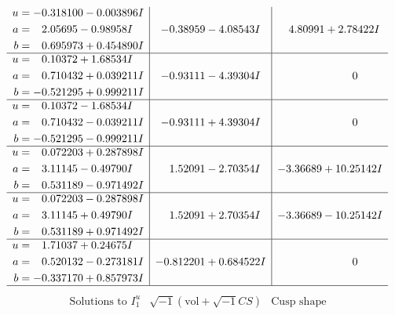 \documentclass[1p]{elsarticle_modified}
\theoremstyle{definition}
\newcommand{\I}{\sqrt{-1}}
\begin{document}
$$\begin{array}{c|c|c}
\begin{aligned}
u &= -0.318100 - 0.003896 I \\
a &= \phantom{-}2.05695 - 0.98958 I \\
b &= \phantom{-}0.695973 + 0.454890 I\end{aligned}
 & -0.38959 - 4.08543 I & \phantom{-}4.80991 + 2.78422 I \\ \hline\begin{aligned}
u &= \phantom{-}0.10372 + 1.68534 I \\
a &= \phantom{-}0.710432 + 0.039211 I \\
b &= -0.521295 + 0.999211 I\end{aligned}
 & -0.93111 - 4.39304 I & \phantom{-0.000000 } 0 \\ \hline\begin{aligned}
u &= \phantom{-}0.10372 - 1.68534 I \\
a &= \phantom{-}0.710432 - 0.039211 I \\
b &= -0.521295 - 0.999211 I\end{aligned}
 & -0.93111 + 4.39304 I & \phantom{-0.000000 } 0 \\ \hline\begin{aligned}
u &= \phantom{-}0.072203 + 0.287898 I \\
a &= \phantom{-}3.11145 - 0.49790 I \\
b &= \phantom{-}0.531189 - 0.971492 I\end{aligned}
 & \phantom{-}1.52091 - 2.70354 I & -3.36689 + 10.25142 I \\ \hline\begin{aligned}
u &= \phantom{-}0.072203 - 0.287898 I \\
a &= \phantom{-}3.11145 + 0.49790 I \\
b &= \phantom{-}0.531189 + 0.971492 I\end{aligned}
 & \phantom{-}1.52091 + 2.70354 I & -3.36689 - 10.25142 I \\ \hline\begin{aligned}
u &= \phantom{-}1.71037 + 0.24675 I \\
a &= \phantom{-}0.520132 - 0.273181 I \\
b &= -0.337170 + 0.857973 I\end{aligned}
 & -0.812201 + 0.684522 I & \phantom{-0.000000 } 0\\
 \hline 
 \end{array}$$\newpage$$\begin{array}{c|c|c}  
\text{Solutions to }I^u_{1}& \I (\text{vol} + \sqrt{-1}CS) & \text{Cusp shape}\\

\end{array}$$
\end{document}

